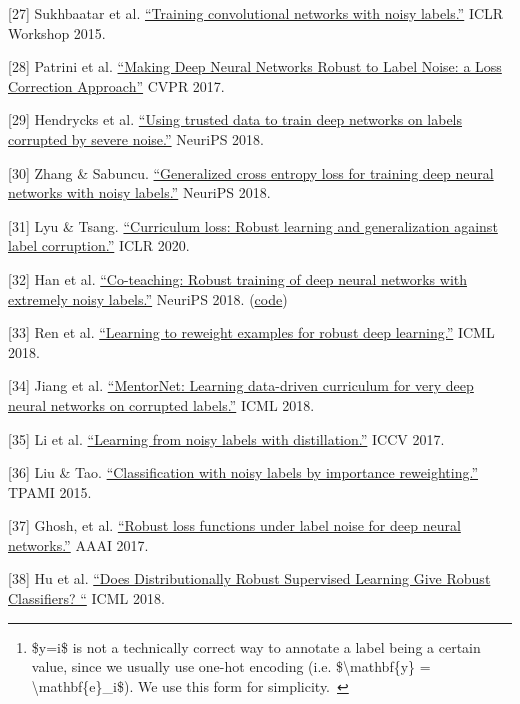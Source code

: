 {[}27{]} Sukhbaatar et al. \href{https://arxiv.org/abs/1406.2080}{``Training convolutional networks with noisy labels.''} ICLR Workshop 2015.

{[}28{]} Patrini et al. \href{https://arxiv.org/abs/1609.03683}{``Making Deep Neural Networks Robust to Label Noise: a Loss Correction Approach''} CVPR 2017.

{[}29{]} Hendrycks et al. \href{https://arxiv.org/abs/1802.05300}{``Using trusted data to train deep networks on labels corrupted by severe noise.''} NeuriPS 2018.

{[}30{]} Zhang \& Sabuncu. \href{https://arxiv.org/abs/1805.07836}{``Generalized cross entropy loss for training deep neural networks with noisy labels.''} NeuriPS 2018.

{[}31{]} Lyu \& Tsang. \href{https://arxiv.org/abs/1905.10045}{``Curriculum loss: Robust learning and generalization against label corruption.''} ICLR 2020.

{[}32{]} Han et al. \href{https://arxiv.org/abs/1804.06872}{``Co-teaching: Robust training of deep neural networks with extremely noisy labels.''} NeuriPS 2018. (\href{https://github.com/bhanML/Co-teaching}{code})

{[}33{]} Ren et al. \href{https://arxiv.org/abs/1803.09050}{``Learning to reweight examples for robust deep learning.''} ICML 2018.

{[}34{]} Jiang et al. \href{https://arxiv.org/abs/1712.05055}{``MentorNet: Learning data-driven curriculum for very deep neural networks on corrupted labels.''} ICML 2018.

{[}35{]} Li et al. \href{https://arxiv.org/abs/1703.02391}{``Learning from noisy labels with distillation.''} ICCV 2017.

{[}36{]} Liu \& Tao. \href{https://arxiv.org/abs/1411.7718}{``Classification with noisy labels by importance reweighting.''} TPAMI 2015.

{[}37{]} Ghosh, et al. \href{https://arxiv.org/abs/1712.09482}{``Robust loss functions under label noise for deep neural networks.''} AAAI 2017.

{[}38{]} Hu et al. \href{https://arxiv.org/abs/1611.02041}{``Does Distributionally Robust Supervised Learning Give Robust Classifiers? ``} ICML 2018.

\begin{center}\rule{0.5\linewidth}{0.5pt}\end{center}

\begin{enumerate}
\item
  \label{fn:1}
  \$y=i\$ is not a technically correct way to annotate a label being a certain value, since we usually use one-hot encoding (i.e. \$\textbackslash mathbf\{y\} = \textbackslash mathbf\{e\}\_i\$). We use this form for simplicity.~\hyperref[fnref:1]{↩︎}
\end{enumerate}

